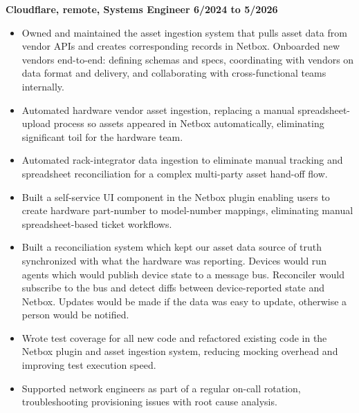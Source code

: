 \documentclass{res}
\begin{document}
\begin{resume}
  {\large \bf Cloudflare, remote, Systems Engineer \hfill 6/2024 to 5/2026}
  \begin{itemize}
  \item
    Owned and maintained the asset ingestion system that pulls asset
    data from vendor APIs and creates corresponding records in Netbox.
    Onboarded new vendors end-to-end: defining schemas and specs,
    coordinating with vendors on data format and delivery, and
    collaborating with cross-functional teams internally.
  \item
    Automated hardware vendor asset ingestion, replacing a manual
    spreadsheet-upload process so assets appeared in Netbox
    automatically, eliminating significant toil for the hardware team.
  \item
    Automated rack-integrator data ingestion to eliminate manual
    tracking and spreadsheet reconciliation for a complex multi-party
    asset hand-off flow.
  \item
    Built a self-service UI component in the Netbox plugin enabling users
    to create hardware part-number to model-number mappings, eliminating
    manual spreadsheet-based ticket workflows.
  \item
    Built a reconciliation system which kept our asset data source of truth
    synchronized with what the hardware was reporting.  Devices
    would run agents which would publish device state to a message
    bus.  Reconciler would subscribe to the bus and detect diffs between
    device-reported state and Netbox.  Updates would be made if the
    data was easy to update, otherwise a person would be notified.
  \item
    Wrote test coverage for all new code and refactored existing code in the
    Netbox plugin and asset ingestion system, reducing mocking overhead and
    improving test execution speed.
  \item
    Supported network engineers as part of a regular on-call rotation,
    troubleshooting provisioning issues with root cause analysis.
  \end{itemize}


\end{resume}
\end{document}
